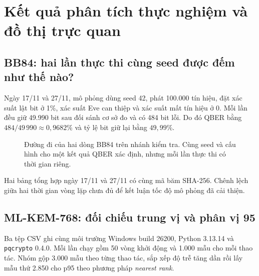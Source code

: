 \documentclass[11pt,a4paper]{article}
\begin{document}
\newpage
\section{Kết quả phân tích thực nghiệm và đồ thị trực quan}
\subsection{BB84: hai lần thực thi cùng seed được đếm như thế nào?}
Ngày 17/11 và 27/11, mô phỏng dùng seed 42, phát 100.000 tín hiệu, đặt xác suất lật bit ở 1\%, xác suất Eve can thiệp và xác suất mất tín hiệu ở 0. Mỗi lần đều giữ 49.990 bit sau đối sánh cơ sở đo và có 484 bit lỗi. Do đó QBER bằng $484/49\,990 \approx 0{,}9682\%$ và tỷ lệ bit giữ lại bằng $49{,}99\%$.

\begin{figure}[ht]
\centering
{}
\caption{Đường đi của hai dòng BB84 trên nhánh kiểm tra. Cùng seed và cấu hình cho một kết quả QBER xác định, nhưng mỗi lần thực thi có thời gian riêng.}
\end{figure}

Hai bảng tổng hợp ngày 17/11 và 27/11 có cùng mã băm SHA-256. Chênh lệch giữa hai thời gian vòng lặp chưa đủ để kết luận tốc độ mô phỏng đã cải thiện.

\subsection{ML-KEM-768: đối chiếu trung vị và phân vị 95}
Ba tệp CSV ghi cùng môi trường Windows build 26200, Python 3.13.14 và \texttt{pqcrypto} 0.4.0. Mỗi lần chạy gồm 50 vòng khởi động và 1.000 mẫu cho mỗi thao tác. Nhóm gộp 3.000 mẫu theo từng thao tác, sắp xếp độ trễ tăng dần rồi lấy mẫu thứ 2.850 cho p95 theo phương pháp \textit{nearest rank}.
\end{document}
